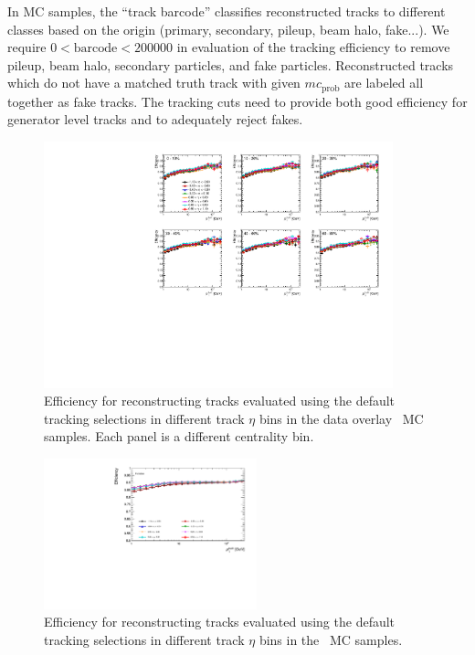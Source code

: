 In MC samples, the ``track barcode'' classifies reconstructed tracks to different classes based on the origin (primary, secondary, pileup, beam halo, fake...).  We require $0 < \mathrm{barcode} < 200000$ in evaluation of the tracking efficiency to remove pileup, beam halo, secondary particles, and fake particles.  Reconstructed tracks which do not have a matched truth track with given $mc_{\mathrm{prob}}$ are labeled all together as fake tracks. The tracking cuts need to provide both good efficiency for generator level tracks and to adequately reject fakes.

\begin{figure}[ht]
   \centerline{
      \includegraphics[width=0.9\textwidth]{figures/main/corrections/eff_cent_trketa_PbPb_ppTight.pdf}
   }
   \caption{Efficiency for reconstructing tracks evaluated using the default tracking selections in different track $\eta$ bins in the data overlay \pbpb\ MC samples. Each panel is a different centrality bin.}
   \label{fig:pbpbeffdefault_final}
\end{figure}

\begin{figure}[ht]
   \centerline{
      \includegraphics[width=0.55\textwidth]{figures/main/corrections/eff_cent_trketa_pp_ppTight.pdf}
   }
   \caption{Efficiency for reconstructing tracks evaluated using the default tracking selections in different track $\eta$ bins in the \pp\ MC samples.}
   \label{fig:ppeffdefault_final}
\end{figure}

